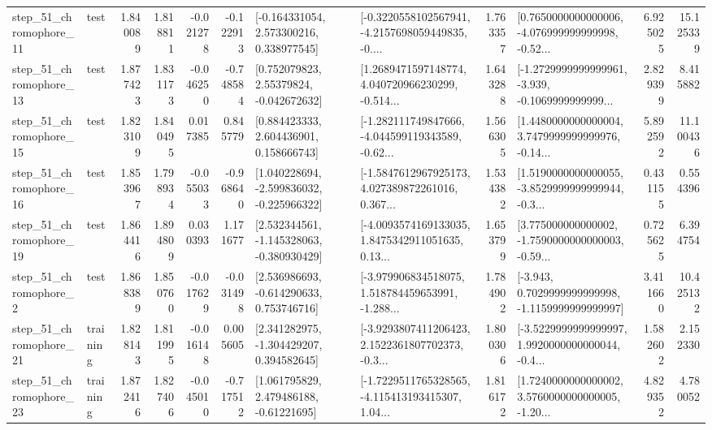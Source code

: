 \begin{tabular}{llrrrrllrlrr}
   step\_51\_chromophore\_11 &      test &      1.840089 &    1.818811 &     -0.021278 & -0.122913 &    [-0.164331054, 2.573300216, 0.338977545] &  [-0.3220558102567941, -4.2157698059449835, -0.... &       1.763357 &  [0.7650000000000006, -4.076999999999998, -0.52... &            6.925025 &         15.125339 \\
   step\_51\_chromophore\_13 &      test &      1.877423 &    1.831173 &     -0.046250 & -0.748584 &     [0.752079823, 2.55379824, -0.042672632] &  [1.2689471597148774, 4.040720966230299, -0.514... &       1.643288 &  [-1.2729999999999961, -3.939, -0.1069999999999... &            2.829399 &          8.415882 \\
   step\_51\_chromophore\_15 &      test &      1.823109 &    1.840495 &      0.017385 &  0.845779 &     [0.884423333, 2.604436901, 0.158666743] &  [-1.282111749847666, -4.044599119343589, -0.62... &       1.566305 &  [1.4480000000000004, 3.7479999999999976, -0.14... &            5.892592 &         11.100436 \\
   step\_51\_chromophore\_16 &      test &      1.853967 &    1.798934 &     -0.055033 & -0.968640 &   [1.040228694, -2.599836032, -0.225966322] &  [-1.5847612967925173, 4.027389872261016, 0.367... &       1.534382 &  [1.5190000000000055, -3.8529999999999944, -0.3... &            0.431155 &          0.554396 \\
   step\_51\_chromophore\_19 &      test &      1.864416 &    1.894809 &      0.030393 &  1.171677 &   [2.532344561, -1.145328063, -0.380930429] &  [-4.0093574169133035, 1.8475342911051635, 0.13... &       1.653799 &  [3.775000000000002, -1.7590000000000003, -0.59... &            0.725625 &          6.394754 \\
    step\_51\_chromophore\_2 &      test &      1.868389 &    1.850760 &     -0.017629 & -0.031498 &    [2.536986693, -0.614290633, 0.753746716] &  [-3.979906834518075, 1.518784459653991, -1.288... &       1.784902 &  [-3.943, 0.7029999999999998, -1.1159999999999997] &            3.411660 &         10.425132 \\
   step\_51\_chromophore\_21 &  training &      1.828143 &    1.811995 &     -0.016148 &  0.005605 &    [2.341282975, -1.304429207, 0.394582645] &  [-3.9293807411206423, 2.1522361807702373, -0.3... &       1.800306 &  [-3.5229999999999997, 1.9920000000000044, -0.4... &            1.582602 &          2.152330 \\
   step\_51\_chromophore\_23 &  training &      1.872416 &    1.827406 &     -0.045010 & -0.717512 &     [1.061795829, 2.479486188, -0.61221695] &  [-1.7229511765328565, -4.115413193415307, 1.04... &       1.816172 &  [1.7240000000000002, 3.5760000000000005, -1.20... &            4.829352 &          4.780052 \\

\end{tabular}
